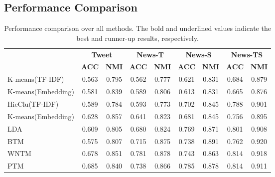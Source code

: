 \subsection{Performance Comparison}

\begin{table}[t]
\centering
\renewcommand{\arraystretch}{1.2} %
\setlength{\tabcolsep}{9pt} %
\caption{Performance comparison over all methods. The bold and underlined values indicate the best and runner-up results, respectively.}
\begin{tabular}{lcccccccc}
\hline
          & \multicolumn{2}{c}{\textbf{Tweet}} & \multicolumn{2}{c}{\textbf{News-T}} & \multicolumn{2}{c}{\textbf{News-S}} & \multicolumn{2}{c}{\textbf{News-TS}} \\ \cline{2-9} 
                         & \textbf{ACC} & \textbf{NMI}       & \textbf{ACC} & \textbf{NMI}       & \textbf{ACC} & \textbf{NMI}       & \textbf{ACC} & \textbf{NMI}        \\ \hline
K-means(TF-IDF)          & 0.563        & 0.795              & 0.562        & 0.777              & 0.621        & 0.831              & 0.684        & 0.879               \\
K-means(Embedding)       & 0.581        & 0.839              & 0.589        & 0.806              & 0.613        & 0.831              & 0.665        & 0.876               \\
HieClu(TF-IDF)          & 0.589        & 0.784              & 0.593        & 0.773               & 0.702        & 0.845              & 0.788        & 0.901               \\
K-means(Embedding)       & 0.628        & 0.857              & 0.641        & 0.823               & 0.681        & 0.845              & 0.756        & 0.895               \\
LDA                      & 0.609        & 0.805              & 0.680        & 0.824              & 0.769        & 0.871              & 0.801        & 0.908               \\
BTM                      & 0.575        & 0.807              & 0.715        & 0.875              & 0.738        & 0.891              & 0.762        & 0.920               \\
WNTM                     & 0.678        & 0.851              & 0.781        & 0.878              & 0.743        & 0.863              & 0.814        & 0.918               \\
PTM                      & 0.685        & 0.840              & 0.738        & 0.866              & 0.785        & 0.878              & 0.814        & 0.911               \\

\end{tabular}
\end{table}
